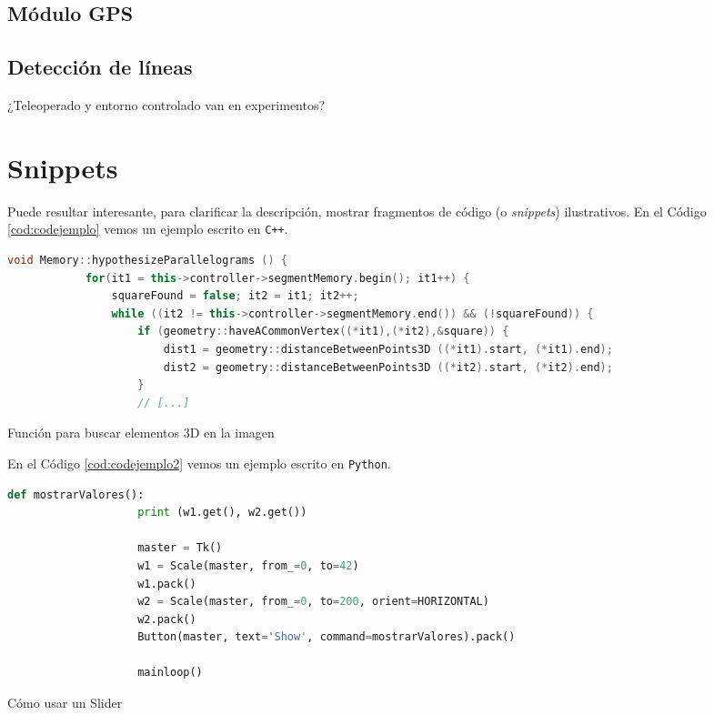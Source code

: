 \subsection{Módulo GPS}

\subsection{Detección de líneas}


¿Teleoperado y entorno controlado van en experimentos?



\section{Snippets}

Puede resultar interesante, para clarificar la descripción, mostrar fragmentos de código (o \textit{snippets}) ilustrativos. En el Código \ref{cod:codejemplo} vemos un ejemplo escrito en \texttt{C++}.

\begin{code}[h]
	\begin{lstlisting}[language=C++]
		void Memory::hypothesizeParallelograms () {
			for(it1 = this->controller->segmentMemory.begin(); it1++) {
				squareFound = false; it2 = it1; it2++;
				while ((it2 != this->controller->segmentMemory.end()) && (!squareFound)) {
					if (geometry::haveACommonVertex((*it1),(*it2),&square)) {
						dist1 = geometry::distanceBetweenPoints3D ((*it1).start, (*it1).end);
						dist2 = geometry::distanceBetweenPoints3D ((*it2).start, (*it2).end);
					}
					// [...]
				\end{lstlisting}
				\caption[Función para buscar elementos 3D en la imagen]{Función para buscar elementos 3D en la imagen}
				\label{cod:codejemplo}
			\end{code}
			
			En el Código \ref{cod:codejemplo2} vemos un ejemplo escrito en \texttt{Python}.
			
			\begin{code}[h]
				\begin{lstlisting}[language=Python]
					def mostrarValores():
					print (w1.get(), w2.get())
					
					master = Tk()
					w1 = Scale(master, from_=0, to=42)
					w1.pack()
					w2 = Scale(master, from_=0, to=200, orient=HORIZONTAL)
					w2.pack()
					Button(master, text='Show', command=mostrarValores).pack()
					
					mainloop()
				\end{lstlisting}
				\caption[Cómo usar un Slider]{Cómo usar un Slider}
				\label{cod:codejemplo2}
			\end{code}
			
